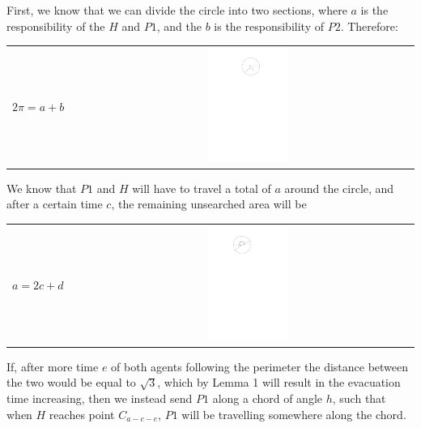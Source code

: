 \documentclass[11pt]{article}
\begin{document}
\begin{flushleft}
    First, we know that we can divide the circle into two sections, where $a$ is the
    responsibility of the $H$ and $P1$, and the $b$ is the responsibility of $P2$.
    Therefore:

    \begin{tabularx}{\textwidth}{lXc}
        \multirow{2}{*}{$2\pi = a+b$} & & \parbox[c]{0.25\textwidth}{\includegraphics[width=0.25\textwidth]{Q2S1_Eq/Q2S1_Old/eq_1.pdf}} \\
    \end{tabularx}

    We know that $P1$ and $H$ will have to travel a total of $a$ around the circle,
    and after a certain time $c$, the remaining unsearched area will be

    \begin{tabularx}{\textwidth}{lXc}
        \multirow{2}{*}{$a = 2c+d$} & & \parbox[c]{0.25\textwidth}{\includegraphics[width=0.25\textwidth]{Q2S1_Eq/Q2S1_Old/eq_2.pdf}} \\
    \end{tabularx}




    If, after more time $e$ of both agents following the perimeter the distance between the two
    would be equal to $\sqrt{3}$, which by Lemma 1 will result in the evacuation time increasing, then
    we instead send $P1$ along a chord of angle $h$, such that when $H$ reaches point $C_{a - c - e}$, $P1$ will be travelling somewhere along the chord.


\end{flushleft}
\end{document}
